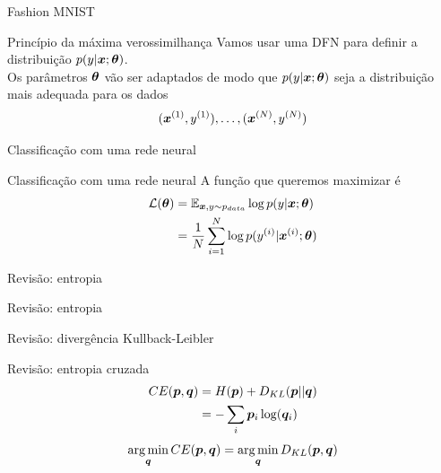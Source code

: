 \documentclass[10pt]{beamer}
\begin{document}
\begin{frame}{Fashion MNIST}

\end{frame}

\begin{frame}{Princípio da máxima verossimilhança}
Vamos usar uma DFN para definir a distribuição $p(y| \bm{x};\bm{\theta})$. \\

Os parâmetros $\bm{\theta}$ vão ser adaptados de modo que  $p(y| \bm{x};\bm{\theta})$ seja a distribuição mais adequada para os dados
\begin{equation*}
(\bm{x}^{(1)},y^{(1)}), \dots, (\bm{x}^{(N)},y^{(N)})
\end{equation*}
\end{frame}

\begin{frame}{Classificação com uma rede neural}

\end{frame}

\begin{frame}{Classificação com uma rede neural}
A função que queremos maximizar é
\Large{
\begin{align*}
\mathcal{L}(\bm{\theta}) &= \operatorname{\mathbb{E}}_{\bm{x},y \sim p_{data}} \log p(y| \bm{x}; \bm{\theta})\\
&= \frac{1}{N}\sum_{i=1}^{N}\log p(y^{(i)}| \bm{x}^{(i)}; \bm{\theta})\\
\end{align*}
}
\end{frame}

\begin{frame}{Revisão: entropia}

\end{frame}

\begin{frame}{Revisão: entropia}

\end{frame}

\begin{frame}{Revisão: divergência Kullback-Leibler}

\end{frame}

\begin{frame}{Revisão: entropia cruzada}
\Large{
\begin{align*}
CE(\vect{p},\vect{q}) &= H(\vect{p}) + D_{KL}(\vect{p}||\vect{q})\\
\vspace{0.2cm}
&= -\sum_{i}\vect{p}_{i}\log(\vect{q}_{i})
\end{align*}
}
\vspace{0.2cm}
\begin{equation*}
\operatorname*{arg\,min}_{\bm{q}} CE(\bm{p},\bm{q}) =  \operatorname*{arg\,min}_{\bm{q}} D_{KL}(\bm{p},\bm{q})
\end{equation*}
\end{frame}
\end{document}
